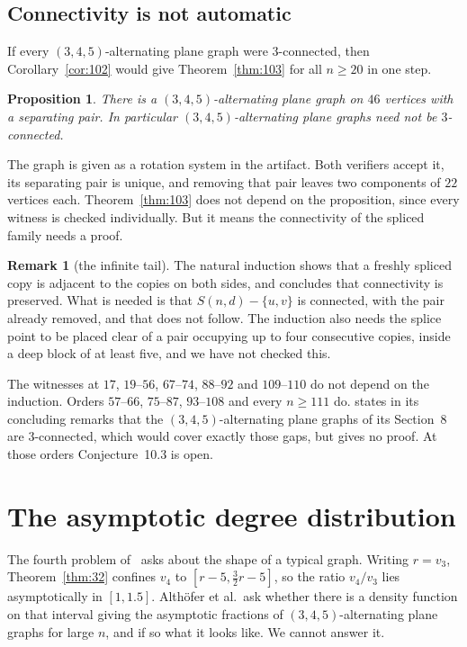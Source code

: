 \documentclass[11pt,a4paper]{amsart}
\theoremstyle{plain}
\newtheorem{proposition}[theorem]{Proposition}
\theoremstyle{definition}
\newtheorem{remark}[theorem]{Remark}
\begin{document}
\subsection{Connectivity is not automatic}

If every $(3,4,5)$-alternating plane graph were $3$-connected, then
Corollary~\ref{cor:102} would give Theorem~\ref{thm:103} for all $n \ge 20$ in
one step.

\begin{proposition}\label{prop:not3conn}
There is a $(3,4,5)$-alternating plane graph on $46$ vertices with a separating
pair. In particular $(3,4,5)$-alternating plane graphs need not be
$3$-connected.
\end{proposition}

The graph is given as a rotation system in the artifact. Both verifiers accept
it, its separating pair is unique, and removing that pair leaves two components
of $22$ vertices each. Theorem~\ref{thm:103} does not depend on the proposition,
since every witness is checked individually. But it means the connectivity of
the spliced family needs a proof.

\begin{remark}[the infinite tail]\label{rem:103gap}
The natural induction shows that a freshly spliced copy is adjacent to the
copies on both sides, and concludes that connectivity is preserved. What is
needed is that $S(n,d) - \{u,v\}$ is connected, with the pair already removed,
and that does not follow. The induction also needs the splice point to be placed
clear of a pair occupying up to four consecutive copies, inside a deep block of
at least five, and we have not checked this.

The witnesses at $17$, $19$--$56$, $67$--$74$, $88$--$92$ and $109$--$110$ do
not depend on the induction. Orders $57$--$66$, $75$--$87$, $93$--$108$ and
every $n \ge 111$ do. \cite{AHSSV2015} states in its concluding remarks that the
$(3,4,5)$-alternating plane graphs of its Section~8 are $3$-connected, which
would cover exactly those gaps, but gives no proof. At those orders
Conjecture~10.3 is open.
\end{remark}

\section{The asymptotic degree distribution}\label{sec:density}

The fourth problem of~\cite[\S10]{AHSSV2015} asks about the shape of a typical
graph. Writing $r = v_3$, Theorem~\ref{thm:32} confines $v_4$ to
$[r-5, \tfrac32 r - 5]$, so the ratio $v_4/v_3$ lies asymptotically in
$[1, 1.5]$. Alth\"ofer et al.\ ask whether there is a density function on that
interval giving the asymptotic fractions of $(3,4,5)$-alternating plane graphs
for large $n$, and if so what it looks like. We cannot answer it.
\end{document}
